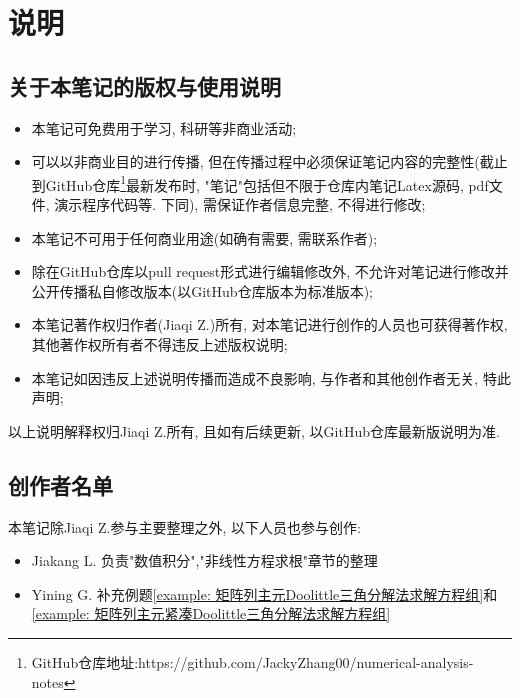 \chapter{说明}

\section{关于本笔记的版权与使用说明}

\begin{itemize}
    \item 本笔记可免费用于学习, 科研等非商业活动;
    \item 可以以非商业目的进行传播, 但在传播过程中必须保证笔记内容的完整性(截止到GitHub仓库\footnote{GitHub仓库地址:https://github.com/JackyZhang00/numerical-analysis-notes}最新发布时, "笔记"包括但不限于仓库内笔记Latex源码, pdf文件, 演示程序代码等. 下同), 需保证作者信息完整, 不得进行修改;
    \item 本笔记不可用于任何商业用途(如确有需要, 需联系作者);
    \item 除在GitHub仓库以pull request形式进行编辑修改外, 不允许对笔记进行修改并公开传播私自修改版本(以GitHub仓库版本为标准版本);
    \item 本笔记著作权归作者(Jiaqi Z.)所有, 对本笔记进行创作的人员也可获得著作权, 其他著作权所有者不得违反上述版权说明;
    \item 本笔记如因违反上述说明传播而造成不良影响, 与作者和其他创作者无关, 特此声明;
\end{itemize}

以上说明解释权归Jiaqi Z.所有, 且如有后续更新, 以GitHub仓库最新版说明为准.

\section{创作者名单}

本笔记除Jiaqi Z.参与主要整理之外, 以下人员也参与创作:

\begin{itemize}
    \item Jiakang L. 负责"数值积分","非线性方程求根"章节的整理
    \item Yining G. 补充例题\ref{example: 矩阵列主元Doolittle三角分解法求解方程组}和\ref{example: 矩阵列主元紧凑Doolittle三角分解法求解方程组}
\end{itemize}